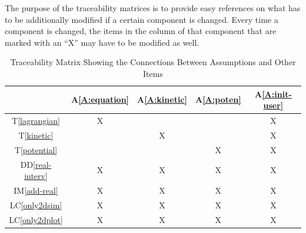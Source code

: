 \documentclass[12pt]{article}
\newcommand{\ddref}[1]{DD\ref{#1}}
\newcommand{\tref}[1]{T\ref{#1}}
\newcommand{\aref}[1]{A\ref{#1}}
\newcommand{\iref}[1]{IM\ref{#1}}
\newcommand{\lcref}[1]{LC\ref{#1}}
\begin{document}
The purpose of the traceability matrices is to provide easy references on what
has to be additionally modified if a certain component is changed. Every time a
component is changed, the items in the column of that component that are marked
with an ``X'' may have to be modified as well. 


\begin{table}[!htb]
\centering
\label{Table:A_trace}
\begin{tabular}{|c|c|c|c|c|}
\hline
	& \aref{A:equation} 
	& \aref{A:kinetic}
	& \aref{A:poten}
	& \aref{A:init-user} \\
\hline
\tref{lagrangian} & X &  &  & X \\ \hline
\tref{kinetic} &  & X &  & X \\ \hline
\tref{potential} &  &  & X & X \\ \hline
\ddref{real-interv} & X & X & X & X \\ \hline
\iref{add-real} & X & X & X & X \\ \hline
\lcref{only2dsim} & X & X & X & X \\ \hline
\lcref{only2dplot} & X & X & X & X \\ \hline
\end{tabular}
\caption{Traceability Matrix Showing the Connections Between Assumptions 
and Other Items}
\end{table}
\end{document}

